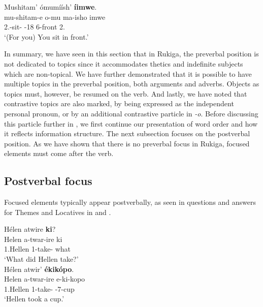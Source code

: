 \documentclass[output=paper]{langscibook}
\begin{document}
\ex
\label{bkm:Ref113439996:b}
Mushitam’ ómumíísh’ \textbf{íimwe}.\\
\gll
mu-shitam-e  o-mu  ma-isho  imwe\\
2\PL{}.\SM{}-sit-\SBJV{}  \AUG{}-18  6-front  2\PL{}.\PRO{} \\
\glt
‘(For you) You sit in front.’\\

\z
\z

In summary, we have seen in this section that in Rukiga, the preverbal position is not dedicated to topics since it accommodates thetics and indefinite subjects which are non-topical. We have further demonstrated that it is possible to have multiple topics in the preverbal position, both arguments and adverbs. Objects as topics must, however, be resumed on the verb. And lastly, we have noted that contrastive topics are also marked, by being expressed as the independent personal pronoun, or by an additional contrastive particle in \textit{-o}. Before discussing this particle further in , we first continue our presentation of word order and how it reflects information structure. The next subsection  focuses on the postverbal position. As we have shown that there is no preverbal focus in Rukiga,  focused elements must come after the verb.

\subsection{Postverbal focus}
\label{bkm:Ref127958714}
Focused elements typically appear postverbally, as seen in questions and answers for Themes and Locatives in  and .

\ea
\label{bkm:Ref113441667}
\ea
Hélen atwire \textbf{ki}?\\
\gll
Helen  a-twar-ire  ki\\
1.Hellen  1\SM{}-take-\PFV{}  what\\
\glt
‘What did Hellen take?’\\

\ex
Hélen atwir’ \textbf{ékikópo}.\\
\gll
Helen  a-twar-ire  e-ki-kopo\\
1.Hellen  1\SM{}-take-\PFV{}  \AUG{}-7-cup \\
\glt
‘Hellen took a cup.’\\
\end{document}
